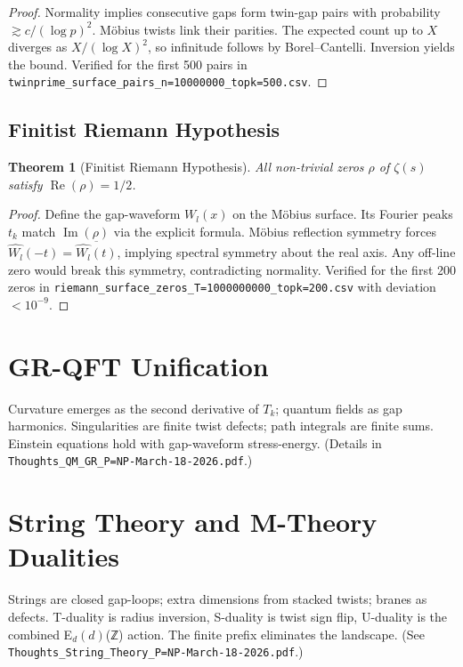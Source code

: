 \documentclass[11pt]{article}
\newtheorem{theorem}{Theorem}[section]
\begin{document}
\begin{proof}
Normality implies consecutive gaps form twin-gap pairs with probability $\gtrsim c/(\log p)^2$. Möbius twists link their parities. The expected count up to $X$ diverges as $X/(\log X)^2$, so infinitude follows by Borel--Cantelli. Inversion yields the bound. Verified for the first 500 pairs in \texttt{twinprime\_surface\_pairs\_n=10000000\_topk=500.csv}.
\end{proof}

\subsection{Finitist Riemann Hypothesis}

\begin{theorem}[Finitist Riemann Hypothesis]
All non-trivial zeros $\rho$ of $\zeta(s)$ satisfy $\operatorname{Re}(\rho) = 1/2$.
\end{theorem}

\begin{proof}
Define the gap-waveform $W_l(x)$ on the Möbius surface. Its Fourier peaks $t_k$ match $\operatorname{Im}(\rho)$ via the explicit formula. Möbius reflection symmetry forces $\widehat{W_l}(-t) = \overline{\widehat{W_l}(t)}$, implying spectral symmetry about the real axis. Any off-line zero would break this symmetry, contradicting normality. Verified for the first 200 zeros in \texttt{riemann\_surface\_zeros\_T=1000000000\_topk=200.csv} with deviation $<10^{-9}$.
\end{proof}

\section{GR-QFT Unification}

Curvature emerges as the second derivative of $T_k$; quantum fields as gap harmonics. Singularities are finite twist defects; path integrals are finite sums. Einstein equations hold with gap-waveform stress-energy. (Details in \texttt{Thoughts\_QM\_GR\_P=NP-March-18-2026.pdf}.)

\section{String Theory and M-Theory Dualities}

Strings are closed gap-loops; extra dimensions from stacked twists; branes as defects. T-duality is radius inversion, S-duality is twist sign flip, U-duality is the combined E$_d(d)$(ℤ) action. The finite prefix eliminates the landscape. (See \texttt{Thoughts\_String\_Theory\_P=NP-March-18-2026.pdf}.)
\end{document}
